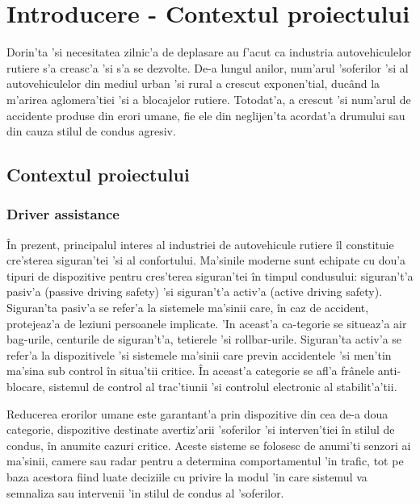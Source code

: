 \documentclass[12pt,a4paper,twoside]{report}
\begin{document}


 

\newpage

\tableofcontents
\newpage



\chapter{Introducere - Contextul proiectului}
\pagestyle{headings}
\setcounter{page}{1}
Dorin'ta 'si necesitatea zilnic'a de deplasare au f'acut ca industria autovehiculelor rutiere s'a creasc'a 'si s'a se dezvolte. De-a lungul anilor, num'arul 'soferilor 'si al autovehiculelor din mediul urban 'si rural a crescut exponen'tial, duc\^and la m'arirea aglomera'tiei 'si a blocajelor rutiere.  Totodat'a, a crescut 'si  num'arul de accidente produse din erori umane, fie ele din neglijen'ta acordat'a  drumului sau din cauza stilul de condus agresiv. 
 

\section{Contextul proiectului}
\subsection{Driver assistance}
\^In prezent, principalul interes al industriei de autovehicule rutiere \^il constituie cre'sterea siguran'tei 'si al confortului. Ma'sinile moderne sunt echipate cu  dou'a tipuri de dispozitive pentru cres'terea siguran'tei \^in timpul condusului: siguran't'a pasiv'a (passive driving safety) 'si siguran't'a activ'a (active driving safety). Siguran'ta pasiv'a se refer'a la sistemele ma'sinii care, \^in caz de accident, protejeaz'a de leziuni persoanele implicate. 'In aceast'a ca-tegorie se situeaz'a air bag-urile, centurile de siguran't'a, tetierele 'si rollbar-urile. Siguran'ta activ'a se refer'a la dispozitivele 'si sistemele ma'sinii care previn accidentele 'si men'tin ma'sina sub control \^in situa'tii critice. \^In aceast'a categorie se afl'a fr\^anele anti-blocare, sistemul de control al trac'tiunii 'si controlul electronic al stabilit'a'tii.

Reducerea erorilor umane este garantant'a prin dispozitive din cea de-a doua categorie, dispozitive destinate avertiz'arii 'soferilor 'si  interven'tiei \^in stilul de condus, \^in anumite cazuri critice. Aceste sisteme se folosesc de anumi'ti senzori ai ma'sinii, camere sau radar pentru a determina comportamentul 'in trafic, tot pe baza acestora fiind luate deciziile cu privire la modul 'in care sistemul va semnaliza sau intervenii 'in stilul de condus al 'soferilor.
\end{document}
